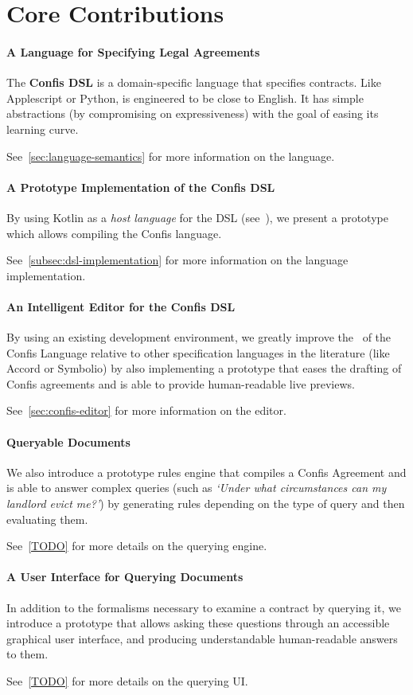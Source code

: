 \section*{Core Contributions}

\paragraph{A Language for Specifying Legal Agreements}
The \textbf{Confis DSL} is a domain-specific language that specifies contracts.
Like Applescript or Python, is engineered to be close to English.
It has simple abstractions (by compromising on expressiveness) with the goal of easing its learning curve.

See~\autoref{sec:language-semantics} for more information on the language.

\paragraph{A Prototype Implementation of the Confis DSL}
By using Kotlin as a \emph{host language} for the DSL (see~), we present a prototype which allows compiling the Confis language.

See~\autoref{subsec:dsl-implementation} for more information on the language implementation.

\paragraph{An Intelligent Editor for the Confis DSL}
By using an existing development environment, we greatly improve the~ of the Confis Language relative to other specification languages in the literature (like Accord or Symbolio) by also implementing a prototype that eases the drafting of Confis agreements and is able to provide human-readable live previews.

See~\autoref{sec:confis-editor} for more information on the editor.

\paragraph{Queryable Documents} We also introduce a prototype rules engine that compiles a Confis Agreement and is able to answer complex queries (such as \emph{`Under what circumstances can my landlord evict me?'}) by generating rules depending on the type of query and then evaluating them.

See~\autoref{TODO} for more details on the querying engine.

\paragraph{A User Interface for Querying Documents} In addition to the formalisms necessary to examine a contract by querying it, we introduce a prototype that allows asking these questions through an accessible graphical user interface, and producing understandable human-readable answers to them.

See~\autoref{TODO} for more details on the querying UI\@.

